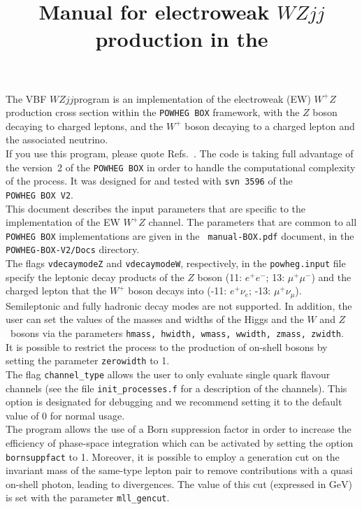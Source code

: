 \documentclass[a4paper,11pt]{article}
\title{Manual for electroweak $WZ jj$ production in the \POWHEGBOXV{}}
\date{}
\newcommand\POWHEGBOX{{\tt POWHEG~BOX}}
\newcommand\POWHEGBOXV{{\tt POWHEG~BOX~V2}}
\def\vbfwz{VBF $WZjj$\;}
\def\wpz{W^+Z}
\def\pbox{{\tt POWHEG BOX}}
\begin{document}
\maketitle
%
\noindent
The \vbfwz program is an implementation of the electroweak
(EW) 
$\wpz$ production cross section within the \pbox{} framework, with the $Z$ boson decaying to charged leptons, and the $W^+$ boson decaying to a charged lepton and the associated neutrino. 
\\[2ex]
If you use this program, please quote
Refs.~\cite{Bozzi:2007ur,JKS,Alioli:2010xd}. The code is taking full
advantage of the version~2 of the \POWHEGBOX{} in order to handle the
computational complexity of the process. It was designed for and tested with \texttt{svn 3596} of the \POWHEGBOXV.
\\[2ex]
This document describes the input parameters that are specific to the
implementation of the EW $\wpz$ channel.  The parameters that are
common to all {\tt POWHEG BOX} implementations are given in the {\tt
  manual-BOX.pdf} document, in the {\tt POWHEG-BOX-V2/Docs} directory.
\\[2ex]
The flags {\tt vdecaymodeZ} and {\tt vdecaymodeW},
respectively, in the {\tt powheg.input} file specify the leptonic decay products of the $Z$ boson
(11: $e^+e^-$; 13: $\mu^+\mu^-$) and the charged lepton that the $W^+$ boson decays into (-11: $e^+\nu_e$; -13: $\mu^+\nu_\mu$). Semileptonic and fully hadronic decay modes are not supported. 
In addition, the user can set the values of the masses and widths of
the Higgs and the $W$ and $Z$~bosons via the parameters {\tt hmass, hwidth,
  wmass, wwidth,   zmass, zwidth}.
\\[2ex]
It is possible to restrict the process to the production of on-shell bosons by setting the parameter {\tt zerowidth} to 1.
\\[2ex]
The flag {\tt channel\_type} allows the user to only evaluate single quark flavour channels (see the file \texttt{init\_processes.f} for a description of the channels). This option is designated for debugging and we recommend setting it to the default value of 0 for normal usage.
\\[2ex]
The program allows the use of a Born suppression factor in order to increase the efficiency of phase-space integration which can be activated by setting the option \texttt{bornsuppfact} to 1. Moreover, it is possible to employ a generation cut on the invariant mass of the same-type lepton pair to remove contributions with a quasi on-shell photon, leading to divergences. The value of this cut (expressed in $\text{GeV}$) is set with the parameter \texttt{mll\_gencut}.
\end{document}
